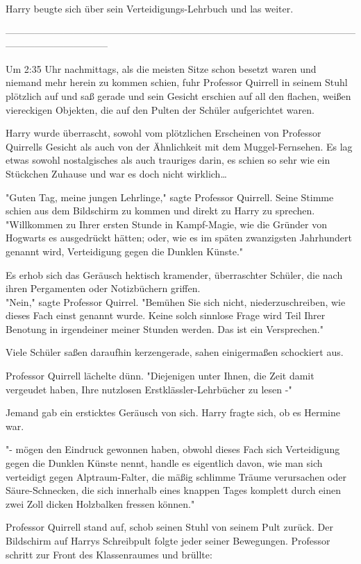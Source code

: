 {Harry beugte sich über sein Verteidigungs-Lehrbuch und las weiter.

--------------------------------------------------------------------------------------------------------------------------------------------

Um 2:35 Uhr nachmittags, als die meisten Sitze schon besetzt waren und niemand mehr herein zu kommen schien, fuhr Professor Quirrell in seinem Stuhl plötzlich auf und saß gerade und sein Gesicht erschien auf all den flachen, weißen viereckigen Objekten, die auf den Pulten der Schüler aufgerichtet waren.

Harry wurde überrascht, sowohl vom plötzlichen Erscheinen von Professor Quirrells Gesicht als auch von der Ähnlichkeit mit dem Muggel-Fernsehen. Es lag etwas sowohl nostalgisches als auch trauriges darin, es schien so sehr wie ein Stückchen Zuhause und war es doch nicht wirklich…

"Guten Tag, meine jungen Lehrlinge," sagte Professor Quirrell. Seine Stimme schien aus dem Bildschirm zu kommen und direkt zu Harry zu sprechen. "Willkommen zu Ihrer ersten Stunde in Kampf-Magie, wie die Gründer von Hogwarts es ausgedrückt hätten; oder, wie es im späten zwanzigsten Jahrhundert genannt wird, Verteidigung gegen die Dunklen Künste."

Es erhob sich das Geräusch hektisch kramender, überraschter Schüler, die nach ihren Pergamenten oder Notizbüchern griffen.\\ "Nein," sagte Professor Quirrel. "Bemühen Sie sich nicht, niederzuschreiben, wie dieses Fach einst genannt wurde. Keine solch sinnlose Frage wird Teil Ihrer Benotung in irgendeiner meiner Stunden werden. Das ist ein Versprechen."

Viele Schüler saßen daraufhin kerzengerade, sahen einigermaßen schockiert aus.

Professor Quirrell lächelte dünn. "Diejenigen unter Ihnen, die Zeit damit vergeudet haben, Ihre nutzlosen Erstklässler-Lehrbücher zu lesen -"

Jemand gab ein ersticktes Geräusch von sich. Harry fragte sich, ob es Hermine war.

"- mögen den Eindruck gewonnen haben, obwohl dieses Fach sich Verteidigung gegen die Dunklen Künste nennt, handle es eigentlich davon, wie man sich verteidigt gegen Alptraum-Falter, die mäßig schlimme Träume verursachen oder Säure-Schnecken, die sich innerhalb eines knappen Tages komplett durch einen zwei Zoll dicken Holzbalken fressen können."

Professor Quirrell stand auf, schob seinen Stuhl von seinem Pult zurück. Der Bildschirm auf Harrys Schreibpult folgte jeder seiner Bewegungen. Professor schritt zur Front des Klassenraumes und brüllte:

}
